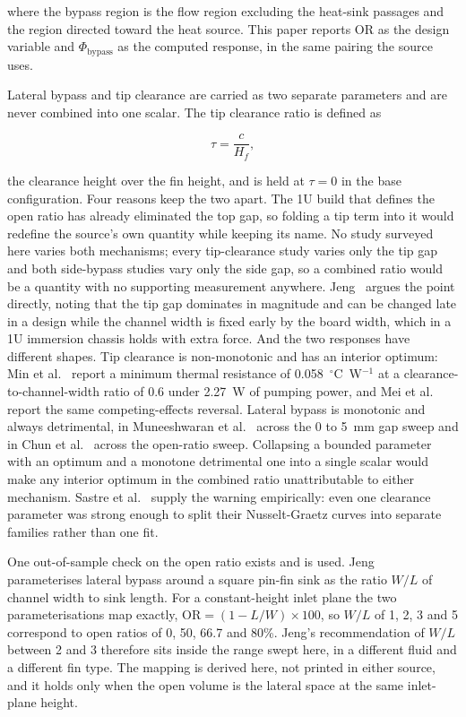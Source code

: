 \noindent
where the bypass region is the flow region excluding the heat-sink passages and the region
directed toward the heat source. This paper reports $\mathrm{OR}$ as the design variable and
$\Phi_{\mathrm{bypass}}$ as the computed response, in the same pairing the source uses.

Lateral bypass and tip clearance are carried as two separate parameters and are never combined
into one scalar. The tip clearance ratio is defined as

\begin{equation}
\tau = \frac{c}{H_f},
\label{eq:tau}
\end{equation}

\noindent
the clearance height over the fin height, and is held at $\tau=0$ in the base configuration. Four
reasons keep the two apart. The 1U build that defines the open ratio has already eliminated the
top gap, so folding a tip term into it would redefine the source's own quantity while keeping its
name. No study surveyed here varies both mechanisms; every tip-clearance study varies only the tip
gap and both side-bypass studies vary only the side gap, so a combined ratio would be a quantity
with no supporting measurement anywhere. Jeng~\cite{jeng2008} argues the point directly, noting
that the tip gap dominates in magnitude and can be changed late in a design while the channel
width is fixed early by the board width, which in a 1U immersion chassis holds with extra force.
And the two responses have different shapes. Tip clearance is non-monotonic and has an interior
optimum: Min et al.~\cite{min2004} report a minimum thermal resistance of 0.058~$^{\circ}$C~W$^{-1}$
at a clearance-to-channel-width ratio of 0.6 under 2.27~W of pumping power, and Mei et
al.~\cite{mei2014} report the same competing-effects reversal. Lateral bypass is monotonic and
always detrimental, in Muneeshwaran et al.~\cite{muneeshwaran2023} across the 0 to 5~mm gap sweep
and in Chun et al.~\cite{chun2026} across the open-ratio sweep. Collapsing a bounded parameter
with an optimum and a monotone detrimental one into a single scalar would make any interior
optimum in the combined ratio unattributable to either mechanism. Sastre et al.~\cite{sastre2018}
supply the warning empirically: even one clearance parameter was strong enough to split their
Nusselt-Graetz curves into separate families rather than one fit.

One out-of-sample check on the open ratio exists and is used. Jeng~\cite{jeng2008} parameterises
lateral bypass around a square pin-fin sink as the ratio $W/L$ of channel width to sink length. For
a constant-height inlet plane the two parameterisations map exactly, $\mathrm{OR} = (1-L/W)\times
100$, so $W/L$ of 1, 2, 3 and 5 correspond to open ratios of 0, 50, 66.7 and 80\%. Jeng's
recommendation of $W/L$ between 2 and 3 therefore sits inside the range swept here, in a different
fluid and a different fin type. The mapping is derived here, not printed in either source, and it
holds only when the open volume is the lateral space at the same inlet-plane height.

